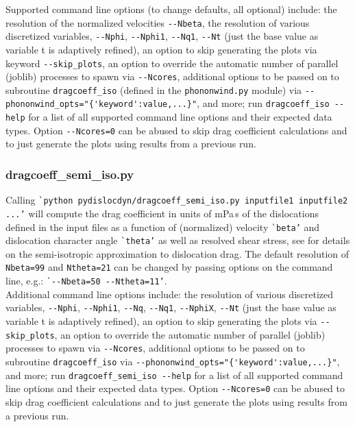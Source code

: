 \documentclass[11pt,letterpaper,oneside,pdftex]{article}
\begin{document}
Supported command line options (to change defaults, all optional) include:
the resolution of the normalized velocities \verb|--Nbeta|,
the resolution of various discretized variables, \verb|--Nphi|, \verb|--Nphi1|, \verb|--Nq1|, \verb|--Nt| (just the base value as variable t is adaptively refined),
an option to skip generating the plots via keyword \verb|--skip_plots|,
an option to override the automatic number of parallel (joblib) processes to spawn via \verb|--Ncores|,
additional options to be passed on to subroutine \verb|dragcoeff_iso| (defined in the \verb|phononwind.py| module) via \verb|--phononwind_opts="{'keyword':value,...}"|,
and more; run \verb|dragcoeff_iso --help| for a list of all supported command line options and their expected data types.
Option \verb|--Ncores=0| can be abused to skip drag coefficient calculations and to just generate the plots using results from a previous run.



\subsubsection{dragcoeff\_semi\_iso.py}

Calling \verb|`python pydislocdyn/dragcoeff_semi_iso.py inputfile1 inputfile2 ...’| will compute the drag coefficient in units of mPa\,s of the dislocations defined in the input files as a function of (normalized) velocity \verb|`beta’| and dislocation character angle \verb|`theta’| as well as resolved shear stress, see \cite{Blaschke:2018anis,Blaschke:2019fits,Blaschke:2021impact} for details on the semi-isotropic approximation to dislocation drag.
The default resolution of \verb|Nbeta=99| and \verb|Ntheta=21| can be changed by passing options on the command line, e.g.:
\verb|`--Nbeta=50 --Ntheta=11’|.\\
Additional command line options include:
the resolution of various discretized variables, \verb|--Nphi|, \verb|--Nphi1|, \verb|--Nq|, \verb|--Nq1|, \verb|--NphiX|, \verb|--Nt| (just the base value as variable t is adaptively refined),
an option to skip generating the plots via \verb|--skip_plots|,
an option to override the automatic number of parallel (joblib) processes to spawn via \verb|--Ncores|,
additional options to be passed on to subroutine \verb|dragcoeff_iso| via \verb|--phononwind_opts="{'keyword':value,...}"|,
and more; run \verb|dragcoeff_semi_iso --help| for a list of all supported command line options and their expected data types.
Option \verb|--Ncores=0| can be abused to skip drag coefficient calculations and to just generate the plots using results from a previous run.
\end{document}
